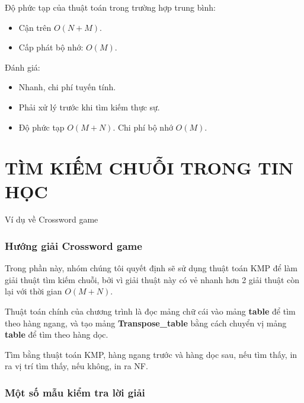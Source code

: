 \documentclass[a4paper,11pt]{article}
\begin{document}
\begin{enumerate}
			Độ phức tạp của thuật toán trong trường hợp trung bình:
			\begin{itemize}
				\item Cận trên $O(N + M)$.
				\item Cấp phát bộ nhớ: $O(M)$.
			\end{itemize}

			Đánh giá:
			\begin{itemize}
				\item Nhanh, chi phí tuyến tính.
				\item Phải xử lý trước khi tìm kiếm thực sự.
				\item Độ phức tạp $O(M + N)$. Chi phí bộ nhớ $O(M)$.
			\end{itemize}

			
	\end{enumerate}
	
	\part*{TÌM KIẾM CHUỖI TRONG TIN HỌC}
	\Large {Ví dụ về Crossword game}
	\setcounter{section}{0}
	\section{Hướng giải Crossword game}

	Trong phần này, nhóm chúng tôi quyết định sẽ sử dụng thuật toán KMP để làm giải thuật tìm kiếm chuỗi, bởi vì giải thuật này có vẻ nhanh hơn 2 giải thuật còn lại với thời gian $O(M + N)$.

	Thuật toán chính của chương trình là đọc mảng chữ cái vào mảng \textbf{table} để tìm theo hàng ngang, và tạo mảng \textbf{Transpose\_table} bằng cách chuyển vị mảng \textbf{table} để tìm theo hàng dọc.

	Tìm bằng thuật toán KMP, hàng ngang trước và hàng dọc sau, nếu tìm thấy, in ra vị trí tìm thấy, nếu không, in ra NF.
	\section{Một số mẫu kiểm tra lời giải}
	
\end{document}
